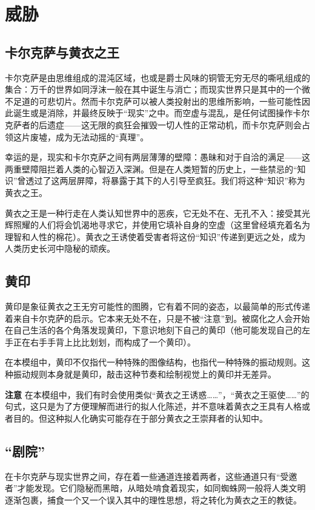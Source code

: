 \section{威胁}

\subsection{卡尔克萨与黄衣之王}

卡尔克萨是由思维组成的混沌区域，也或是爵士风味的铜管无穷无尽的嘶吼组成的集合：万千的世界如同浮沫一般在其中诞生与消亡；而现实世界只是其中的一个微不足道的可悲切片。然而卡尔克萨可以被人类投射出的思维所影响，一些可能性因此诞生或是消除，并最终反映于“现实”之中。而空虚与混乱，是任何试图操作卡尔克萨者的后遗症——这无限的疯狂会摧毁一切人性的正常动机，而卡尔克萨则会占领这片废墟，成为无法动摇的“真理”。

幸运的是，现实和卡尔克萨之间有两层薄薄的壁障：愚昧和对于自洽的满足——这两重壁障阻拦着人类的心智迈入深渊。但是在人类短暂的历史上，一些禁忌的“知识”曾透过了这两层屏障，将暴露于其下的人引导至疯狂。我们将这种“知识”称为黄衣之王。

黄衣之王是一种行走在人类认知世界中的恶疾，它无处不在、无孔不入：接受其光辉照耀的人们将会饥渴地寻求它，并使用它填补自身的空虚（这里曾经填充着名为理智和人性的棉花）。黄衣之王诱使着受害者将这份“知识”传递到更远之处，成为人类历史长河中隐秘的顽疾。

\subsection{黄印}
黄印是象征黄衣之王无穷可能性的图腾，它有着不同的姿态，以最简单的形式传递着来自卡尔克萨的启示。它本来无处不在，只是不被“注意”到。被腐化之人会开始在自己生活的各个角落发现黄印，下意识地刻下自己的黄印（他可能发现自己的左手正在右手手背上比比划划，而构成了一个黄印）。

在本模组中，黄印不仅指代一种特殊的图像结构，也指代一种特殊的振动规则。这种振动规则本身就是黄印，敲击这种节奏和绘制视觉上的黄印并无差异。

\textbf{注意}
在本模组中，我们有时会使用类似“黄衣之王诱惑……”，“黄衣之王驱使……”的句式，这只是为了方便理解而进行的拟人化陈述，并不意味着黄衣之王具有人格或者目的。但这种拟人化确实可能存在于部分黄衣之王崇拜者的认知中。

\subsection{“剧院”}
在卡尔克萨与现实世界之间，存在着一些通道连接着两者，这些通道只有“受邀者”才能发现。它们隐秘而黑暗，从暗处啃食着现实，如同蜘蛛网一般将人类文明逐渐包裹，捕食一个又一个误入其中的理性思想，将之转化为黄衣之王的教徒。

